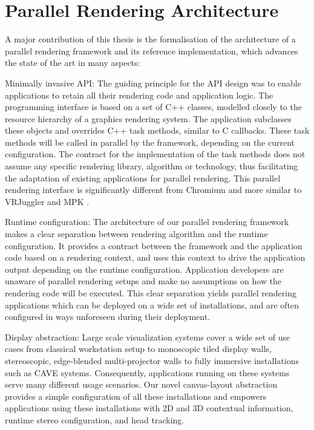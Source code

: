 \section{Parallel Rendering Architecture}

A major contribution of this thesis is the formalisation of the architecture of
a parallel rendering framework and its reference implementation, which advances
the state of the art in many aspects:

\begin{compactdesc}

\item[Minimally invasive API:] The guiding principle for the API design was to
enable applications to retain all their rendering code and application logic.
The programming interface is based on a set of C++ classes, modelled closely to
the resource hierarchy of a graphics rendering system. The application
subclasses these objects and overrides C++ task methods, similar to C
callbacks. These task methods will be called in parallel by the framework,
depending on the current configuration. The contract for the implementation of
the task methods does not assume any specific rendering library, algorithm or
technology, thus facilitating the adaptation of existing applications for
parallel rendering. This parallel rendering interface is significantly
different from Chromium \cite{HHNFAKK:02} and more similar to VRJuggler
\cite{BJHMBC:01} and MPK \cite{BRE:05}.

\item[Runtime configuration:] The architecture of our parallel rendering
framework makes a clear separation between rendering algorithm and the runtime
configuration. It provides a contract between the framework and the application
code based on a rendering context, and uses this context to drive the
application output depending on the runtime configuration. Application
developers are unaware of parallel rendering setups and make no assumptions on
how the rendering code will be executed. This clear separation yields parallel
rendering applications which can be deployed on a wide set of installations,
and are often configured in ways unforeseen during their deployment.

\item[Display abstraction:] Large scale visualization systems cover a wide set
of use cases from classical workstation setup to monoscopic tiled display
walls, stereoscopic, edge-blended multi-projector walls to fully immersive
installations such as CAVE systems. Consequently, applications running on these
systems serve many different usage scenarios. Our novel canvas-layout
abstraction provides a simple configuration of all these installations and
empowers applications using these installations with 2D and 3D contextual
information, runtime stereo configuration, and head tracking.


\end{compactdesc}
